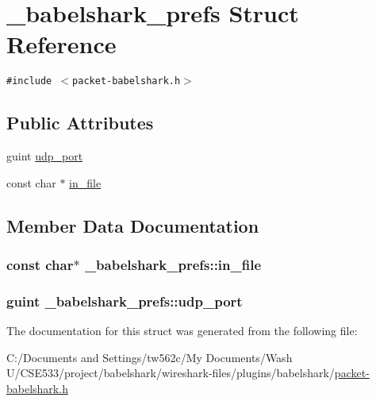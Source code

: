 \hypertarget{struct__babelshark__prefs}{
\section{\_\-babelshark\_\-prefs Struct Reference}
\label{struct__babelshark__prefs}
}
{\tt \#include $<$packet-babelshark.h$>$}

\subsection*{Public Attributes}
\begin{CompactItemize}
\item 
guint \hyperlink{struct__babelshark__prefs_7903e6255e73bcc4caa150d38ddd4694}{udp\_\-port}
\item 
const char $\ast$ \hyperlink{struct__babelshark__prefs_81ea74338ab12014ff27a443b30fc1e3}{in\_\-file}
\end{CompactItemize}


\subsection{Member Data Documentation}
\hypertarget{struct__babelshark__prefs_81ea74338ab12014ff27a443b30fc1e3}{
\subsubsection[{in\_\-file}]{\setlength{\rightskip}{0pt plus 5cm}const char$\ast$ {\bf \_\-babelshark\_\-prefs::in\_\-file}}}
\label{struct__babelshark__prefs_81ea74338ab12014ff27a443b30fc1e3}


\hypertarget{struct__babelshark__prefs_7903e6255e73bcc4caa150d38ddd4694}{
\subsubsection[{udp\_\-port}]{\setlength{\rightskip}{0pt plus 5cm}guint {\bf \_\-babelshark\_\-prefs::udp\_\-port}}}
\label{struct__babelshark__prefs_7903e6255e73bcc4caa150d38ddd4694}




The documentation for this struct was generated from the following file:\begin{CompactItemize}
\item 
C:/Documents and Settings/tw562c/My Documents/Wash U/CSE533/project/babelshark/wireshark-files/plugins/babelshark/\hyperlink{packet-babelshark_8h}{packet-babelshark.h}\end{CompactItemize}
